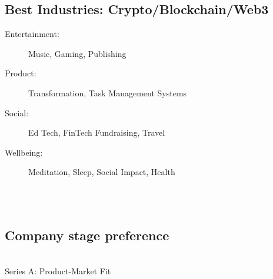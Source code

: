 {{\subsection*{%
Best Industries:
Crypto/Blockchain/Web3
}
\begin{description}
\item[Entertainment:] Music,
Gaming,
Publishing
\item[Product:]
Transformation,
Task Management Systems
\item[Social:]
Ed Tech,
FinTech
Fundraising,
Travel %
\item[Wellbeing:] Meditation, Sleep, Social Impact, Health %
\end{description}
\\ \\
\subsection*{Company stage preference}     \\
Series A:
Product-Market Fit






    }%
}
